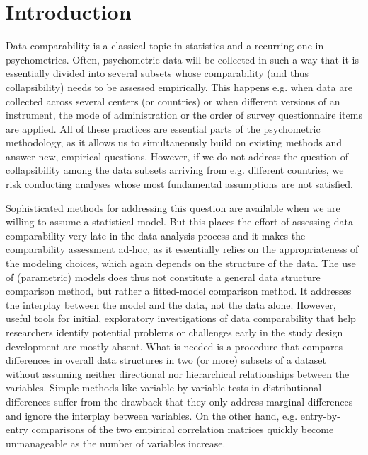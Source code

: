 \documentclass[titlepage,11pt,twoside]{article}
\begin{document}
\vspace{\fill}\newpage

\section{Introduction}
\label{sec:introduction}

Data comparability is a classical topic in statistics and a recurring one in psychometrics. Often, psychometric data will be collected in such a way that it is essentially divided into several subsets whose comparability (and thus collapsibility) needs to be assessed empirically. This happens e.g. when data are collected across several centers (or countries) or when different versions of an instrument, the mode of administration or the order of survey questionnaire items are applied. All of these practices are essential parts of the psychometric methodology, as it allows us to simultaneously build on existing methods and answer new, empirical questions. However, if we do not address the question of collapsibility among the data subsets arriving from e.g. different countries, we risk conducting analyses whose most fundamental assumptions are not satisfied. 

Sophisticated methods for addressing this question are available when we are willing to assume a statistical model. But this places the effort of assessing data comparability very late in the data analysis process and it makes the comparability assessment %
ad-hoc, as it essentially relies on the appropriateness of the modeling choices, which again depends on the structure of the data. The use of (parametric) models does thus not constitute a %
general data structure comparison method, but rather a fitted-model comparison method. It addresses the interplay between the model and the data, not the data alone. However, useful tools for initial, exploratory investigations of data comparability that help researchers identify potential problems or challenges early in the study design development are mostly absent. What is needed is a procedure that compares differences in overall data structures in two (or more) subsets of a dataset without assuming neither directional nor hierarchical relationships between the variables. Simple methods like variable-by-variable tests in distributional differences suffer from the drawback that they only address marginal differences and ignore the interplay between variables. On the other hand, e.g. entry-by-entry comparisons of the two empirical correlation matrices quickly become unmanageable as the number of variables increase. 
\end{document}

